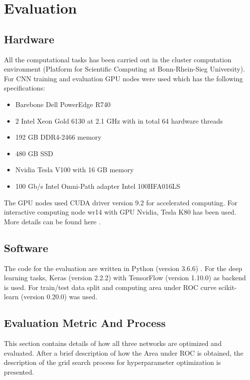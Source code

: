
\chapter{Evaluation}
\label{chap:evaluation}
\section{Hardware}
\label{gpu}
All the computational tasks has been carried out in the cluster computation environment (Platform for Scientific Computing at Bonn-Rhein-Sieg University). For CNN training and evaluation GPU nodes were used which has the following specifications:
\begin{itemize}
 \item Barebone Dell PowerEdge R740
 \item 2 Intel Xeon Gold 6130 at 2.1 GHz with in total 64 hardware threads 
 \item 192 GB DDR4-2466 memory
 \item 480 GB SSD
 \item Nvidia Tesla V100 with 16 GB memory
 \item 100 Gb/s Intel Omni-Path adapter Intel 100HFA016LS
\end{itemize}

The GPU nodes used CUDA \cite{cuda} driver version 9.2 for accelerated computing. For interactive computing node wr14 with GPU Nvidia, Tesla K80 has been used. More details can be found here \cite{cluster}.

\section{Software}
The code for the evaluation are written in Python (version 3.6.6) \cite{python}. For the deep learning tasks, Keras (version 2.2.2) \cite{chollet2015keras} with TensorFlow (version 1.10.0) \cite{tensorflow} as backend is used. For train/test
data split and computing area under ROC curve scikit-learn (version 0.20.0) \cite{sklearn} was used.

\section{Evaluation Metric And Process}
This section contains details of how all three networks are optimized and evaluated. After a brief description of how the Area under ROC is obtained, the description of the grid search process for hyperparameter optimization is presented.
